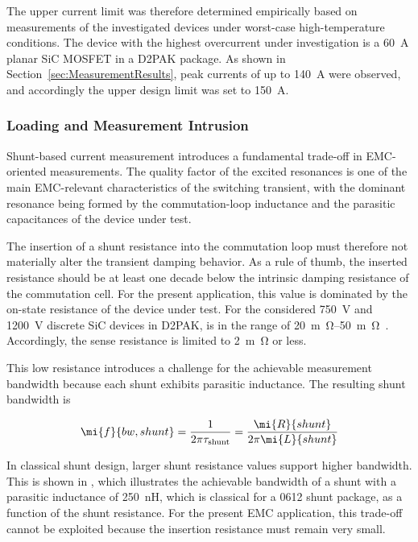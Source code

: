 The upper current limit was therefore determined empirically based on measurements of the investigated devices under worst-case high-temperature conditions.
The device with the highest overcurrent under investigation is a \SI{60}{A} planar SiC MOSFET in a D2PAK package.
As shown in Section~\ref{sec:MeasurementResults}, peak currents of up to \SI{140}{A} were observed, and accordingly the upper design limit was set to \SI{150}{A}.


\subsubsection*{Loading and Measurement Intrusion}
Shunt-based current measurement introduces a fundamental trade-off in EMC-oriented measurements.
The quality factor of the excited resonances is one of the main EMC-relevant characteristics of the switching transient, with the dominant resonance being formed by the commutation-loop inductance and the parasitic capacitances of the device under test.

The insertion of a shunt resistance into the commutation loop must therefore not materially alter the transient damping behavior.
As a rule of thumb, the inserted resistance should be at least one decade below the intrinsic damping resistance of the commutation cell.
For the present application, this value is dominated by the on-state resistance  of the device under test.
For the considered \SI{750}{V} and \SI{1200}{V} discrete SiC devices in D2PAK,  is in the range of \SIrange{20}{50}{m\ohm}~\cite{robert_bosch_gmbh_datasheet_2023,robert_bosch_gmbh_datasheet_2023-1}.
Accordingly, the sense resistance is limited to \SI{2}{m\ohm} or less.

This low resistance introduces a challenge for the achievable measurement bandwidth because each shunt exhibits parasitic inductance.
The resulting shunt bandwidth is

\begin{equation}
    \mi{f}{bw,shunt} = \frac{1}{2\pi \tau_\text{shunt}} = \frac{\mi{R}{shunt}}{2\pi\mi{L}{shunt}} 
    \label{eq:fbw_shunt}
\end{equation}

In classical shunt design, larger shunt resistance values support higher bandwidth.
This is shown in , which illustrates the achievable bandwidth of a shunt with a parasitic inductance of \SI{250}{nH}, which is classical for a 0612 shunt package, as a function of the shunt resistance.
For the present EMC application, this trade-off cannot be exploited because the insertion resistance must remain very small.

